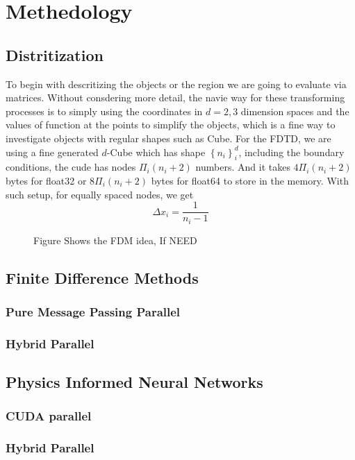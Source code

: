 \section{Methedology}

\subsection{Distritization}
To begin with descritizing the objects or the region we are going to 
evaluate via matrices. Without consdering more detail, the navie way for these transforming processes is to simply using 
the coordinates in $d=2,3$ dimension spaces and the values of function at the points to simplify the 
objects, which is a fine way to investigate objects with regular shapes such as Cube.
For the FDTD, we are using a fine generated $d$-Cube which has shape $\left\{n_i\right\}_i^{d}$, 
including the boundary conditions, the cude has nodes $\Pi_i (n_i+2)$ numbers. 
And it takes $4\Pi_i (n_i+2)$ bytes for float32 or $8\Pi_i (n_i+2)$ bytes for float64 to store in the memory.
With such setup, for equally spaced nodes, we get
\begin{equation}
  \Delta x_i = \frac{1}{n_i-1}
\end{equation}


\begin{figure}[htbp]
  \centering
  
  \caption{Figure Shows the FDM idea, If NEED}
  \label{<label>}
\end{figure}

\subsection{Finite Difference Methods}
\subsubsection{Pure Message Passing Parallel}
\subsubsection{Hybrid Parallel}


\subsection{Physics Informed Neural Networks}
\subsubsection{CUDA parallel}
\subsubsection{Hybrid Parallel}